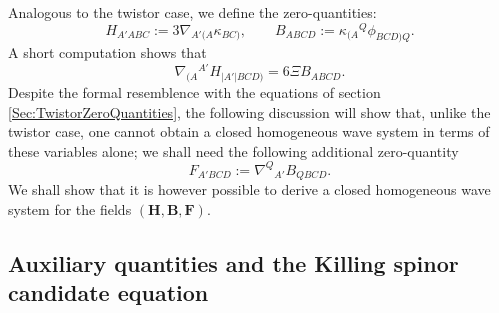 \documentclass[10pt,a4paper]{article}
\theoremstyle{plain}
\def\bmB{{\bm B}}
\def\bmF{{\bm F}}
\def\bmH{{\bm H}}
\begin{document}
Analogous to the twistor case, we define the zero-quantities:
\begin{equation}\label{KS_zero_quantities1}
H_{A'ABC}:=3\nabla_{A'(A}\kappa_{BC)}, \qquad
B_{ABCD}:=\kappa_{(A}{}^Q\phi_{BCD)Q}.
\end{equation}
A short computation shows that
\begin{equation}
\nabla_{(A}{}^{A'}H_{\vert A'\vert BCD)} = 6\Xi
B_{ABCD}. \label{Eq:BuchdahlAsCurlOfH}
\end{equation}
Despite the formal resemblence with the equations of section
\ref{Sec:TwistorZeroQuantities}, the following discussion will show
that, unlike the twistor case, one cannot obtain a closed homogeneous
wave system in terms of these variables alone; we shall need the
following additional zero-quantity
\begin{equation}
 F_{A'BCD}:=\nabla^Q{}_{A'}B_{QBCD}.\label{Eq:DefZeroQuantityF}
\end{equation}
We shall show that it is however possible to derive a closed
homogeneous wave system for the fields $(\bmH, \bmB, \bmF)$.


\subsection{Auxiliary quantities and the Killing spinor candidate equation}
\end{document}
